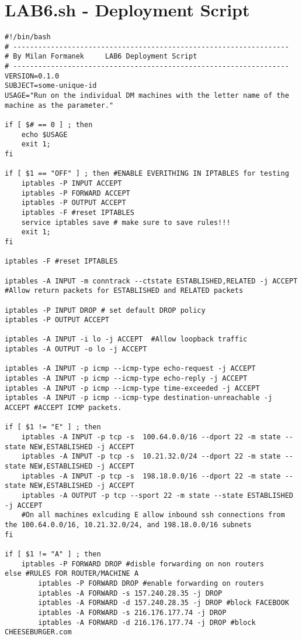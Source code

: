 \documentclass[11pt,onside]{article}
\begin{document}
\section{LAB6.sh - Deployment Script}
\begin{lstlisting}
#!/bin/bash
# ------------------------------------------------------------------
# By Milan Formanek 	LAB6 Deployment Script
# ------------------------------------------------------------------
VERSION=0.1.0
SUBJECT=some-unique-id
USAGE="Run on the individual DM machines with the letter name of the machine as the parameter."

if [ $# == 0 ] ; then
    echo $USAGE
    exit 1;
fi

if [ $1 == "OFF" ] ; then #ENABLE EVERITHING IN IPTABLES for testing
    iptables -P INPUT ACCEPT 
    iptables -P FORWARD ACCEPT 
    iptables -P OUTPUT ACCEPT
    iptables -F #reset IPTABLES
    service iptables save # make sure to save rules!!! 
    exit 1;
fi

iptables -F #reset IPTABLES

iptables -A INPUT -m conntrack --ctstate ESTABLISHED,RELATED -j ACCEPT #Allow return packets for ESTABLISHED and RELATED packets

iptables -P INPUT DROP # set default DROP policy 
iptables -P OUTPUT ACCEPT

iptables -A INPUT -i lo -j ACCEPT  #Allow loopback traffic
iptables -A OUTPUT -o lo -j ACCEPT

iptables -A INPUT -p icmp --icmp-type echo-request -j ACCEPT
iptables -A INPUT -p icmp --icmp-type echo-reply -j ACCEPT
iptables -A INPUT -p icmp --icmp-type time-exceeded -j ACCEPT
iptables -A INPUT -p icmp --icmp-type destination-unreachable -j ACCEPT #ACCEPT ICMP packets.

if [ $1 != "E" ] ; then
	iptables -A INPUT -p tcp -s  100.64.0.0/16 --dport 22 -m state --state NEW,ESTABLISHED -j ACCEPT
	iptables -A INPUT -p tcp -s  10.21.32.0/24 --dport 22 -m state --state NEW,ESTABLISHED -j ACCEPT
	iptables -A INPUT -p tcp -s  198.18.0.0/16 --dport 22 -m state --state NEW,ESTABLISHED -j ACCEPT
	iptables -A OUTPUT -p tcp --sport 22 -m state --state ESTABLISHED -j ACCEPT
	#On all machines exlcuding E allow inbound ssh connections from the 100.64.0.0/16, 10.21.32.0/24, and 198.18.0.0/16 subnets
fi

if [ $1 != "A" ] ; then
	iptables -P FORWARD DROP #disble forwarding on non routers
else #RULES FOR ROUTER/MACHINE A
    	iptables -P FORWARD DROP #enable forwarding on routers
    	iptables -A FORWARD -s 157.240.28.35 -j DROP
    	iptables -A FORWARD -d 157.240.28.35 -j DROP #block FACEBOOK
    	iptables -A FORWARD -s 216.176.177.74 -j DROP
    	iptables -A FORWARD -d 216.176.177.74 -j DROP #block CHEESEBURGER.com
    

\end{lstlisting}
\end{document}
